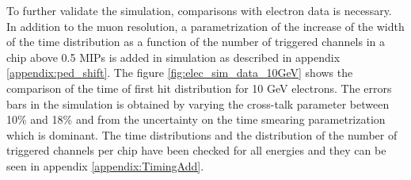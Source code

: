 To further validate the simulation, comparisons with electron data is necessary. In addition to the muon resolution, a parametrization of the increase of the width of the time distribution as a function of the number of triggered channels in a chip above 0.5 MIPs is added in simulation as described in appendix \ref{appendix:ped_shift}. The figure \ref{fig:elec_sim_data_10GeV} shows the comparison of the time of first hit distribution for 10 GeV electrons. The errors bars in the simulation is obtained by varying the cross-talk parameter between 10\% and 18\% and from the uncertainty on the time smearing parametrization which is dominant. The time distributions and the distribution of the number of triggered channels per chip have been checked for all energies and they can be seen in appendix \ref{appendix:TimingAdd}.

